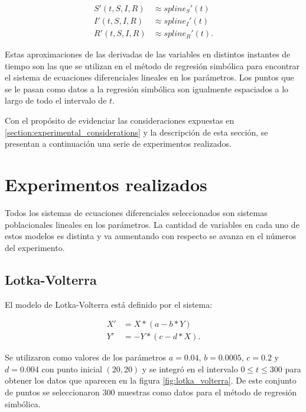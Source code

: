\begin{align*}
    S'(t, S, I, R) & \approx spline_S'(t)  \\
    I'(t, S, I, R) & \approx spline_I'(t)  \\
    R'(t, S, I, R) & \approx spline_R'(t).
\end{align*}

Estas aproximaciones de las derivadas de las variables en distintos instantes de tiempo son las que se utilizan en el método de regresión simbólica para encontrar el sistema de ecuaciones diferenciales lineales en los parámetros. Los puntos que se le pasan como datos a la regresión simbólica son igualmente espaciados a lo largo de todo el intervalo de $t$.

Con el propósito de evidenciar las consideraciones expuestas en \ref{section:experimental_considerations} y la descripción de esta sección, se presentan a continuación una serie de experimentos realizados.

\section{Experimentos realizados}\label{section:experiments}

Todos los sistemas de ecuaciones diferenciales seleccionados son sistemas poblacionales lineales en los parámetros. La cantidad de variables en cada uno de estos modelos es distinta y va aumentando con respecto se avanza en el números del experimento.

\subsection{Lotka-Volterra}

El modelo de Lotka-Volterra está definido por el sistema:

\begin{align*}
    X' & = X * (a - b * Y)   \\
    Y' & = -Y * (c - d * X).
\end{align*}

Se utilizaron como valores de los parámetros $a = 0.04$, $b = 0.0005$, $c = 0.2$ y $d = 0.004$ con punto inicial $(20, 20)$ y se integró en el intervalo $0 \leq t \leq 300$ para obtener los datos que aparecen en la figura \ref{fig:lotka_volterra}. De este conjunto de puntos se seleccionaron 300 muestras como datos para el método de regresión simbólica.


